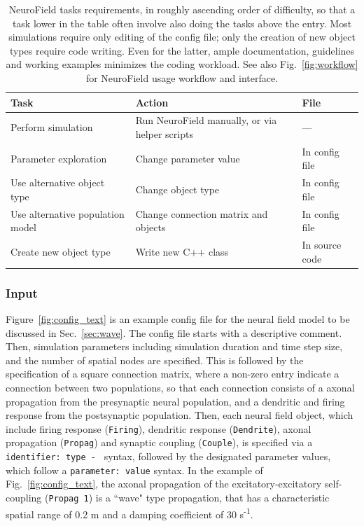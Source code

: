 \documentclass[preprint,review,10pt,authoryear,letterpaper]{elsarticle}
\begin{document}
\begin{table}
	\begin{tabular}{ p{4.2cm} p{4.5cm} l }
	\hline
	Task & Action & File \\
	\hline
	Perform simulation & Run NeuroField manually, or via helper scripts & --- \\
	Parameter exploration & Change parameter value & In config file \\
	Use alternative object type & Change object type & In config file \\
	Use alternative population model & Change connection matrix and objects & In config file \\
	Create new object type & Write new C++ class & In source code \\
	\hline
\end{tabular}
\caption{NeuroField tasks requirements, in roughly ascending order of difficulty, so that a task lower in the table often involve also doing the tasks above the entry. Most simulations require only editing of the config file; only the creation of new object types require code writing. Even for the latter, ample documentation, guidelines and working examples minimizes the coding workload. See also Fig.~\ref{fig:workflow} for NeuroField usage workflow and interface.}
\label{tab:task}
\end{table}

\subsubsection{Input}

Figure~\ref{fig:config_text} is an example config file for the neural field model to be discussed in Sec.~\ref{sec:wave}. The config file starts with a descriptive comment. Then, simulation parameters including simulation duration and time step size, and the number of spatial nodes are specified. This is followed by the specification of a square connection matrix, where a non-zero entry indicate a connection between two populations, so that each connection consists of a axonal propagation from the presynaptic neural population, and a dendritic and firing response from the postsynaptic population. Then, each neural field object, which include firing response ({\tt Firing}), dendritic response ({\tt Dendrite}), axonal propagation ({\tt Propag}) and synaptic coupling ({\tt Couple}), is specified via a {\tt identifier: type - } syntax, followed by the designated parameter values, which follow a {\tt parameter: value} syntax. In the example of Fig.~\ref{fig:config_text}, the axonal propagation of the excitatory-excitatory self-coupling ({\tt Propag 1}) is a ``wave" type propagation, that has a characteristic spatial range of 0.2 m and a damping coefficient of 30 s\textsuperscript{-1}.
\end{document}
